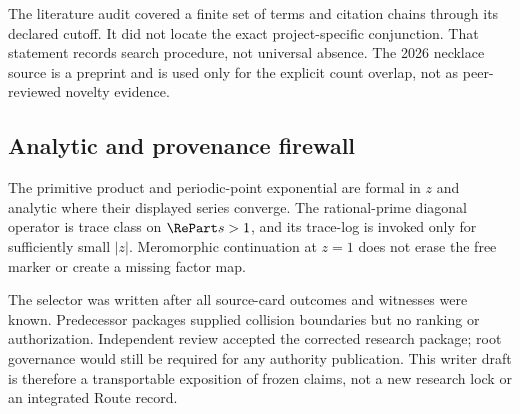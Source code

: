 The literature audit covered a finite set of terms and citation chains
through its declared cutoff. It did not locate the exact project-specific
conjunction. That statement records search procedure, not universal absence.
The 2026 necklace source is a preprint and is used only for the explicit count
overlap, not as peer-reviewed novelty evidence.

\subsection{Analytic and provenance firewall}

The primitive product and periodic-point exponential are formal in $z$ and
analytic where their displayed series converge. The rational-prime diagonal
operator is trace class on $\RePart s>1$, and its trace-log is invoked only
for sufficiently small $|z|$. Meromorphic continuation at $z=1$ does not
erase the free marker or create a missing factor map.

The selector was written after all source-card outcomes and witnesses were
known. Predecessor packages supplied collision boundaries but no ranking or
authorization. Independent review accepted the corrected research package;
root governance would still be required for any authority publication. This
writer draft is therefore a transportable exposition of frozen claims, not a
new research lock or an integrated Route record.
